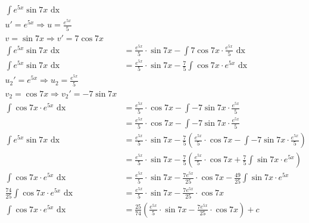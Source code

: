\documentclass[a4paper,12pt]{article}
\newcommand{\?}{\stackrel{?}{=}}
\begin{document}
\begin{definition}
\begin{my_example}
\begin{align*}
  \int e^{5x} \sin 7x \text{ dx}\\
  u' = e^{5x} \Rightarrow u = \frac{e^{5x}}{5}\\
  v = \sin 7x \Rightarrow v' = 7\cos 7x\\
  \int e^{5x} \sin 7x \text{ dx} &= \frac{e^{5x}}{5} \cdot \sin 7x - \int 7\cos 7x \cdot \frac{e^{5x}}{5} \text{ dx}\\
  \int e^{5x} \sin 7x \text{ dx} &= \frac{e^{5x}}{5} \cdot \sin 7x - \frac{7}{5} \int \cos 7x \cdot e^{5x} \text{ dx}\\
  u_2' = e^{5x} \Rightarrow u_2 = \frac{e^{5x}}{5}\\
  v_2 = \cos 7x \Rightarrow v_2' = -7\sin 7x\\
  \int \cos 7x \cdot e^{5x} \text{ dx} &= \frac{e^{5x}}{5} \cdot \cos 7x - \int -7\sin 7x \cdot \frac{e^{5x}}{5}\\
  &= \frac{e^{5x}}{5} \cdot \cos 7x - \int -7\sin 7x \cdot \frac{e^{5x}}{5}\\
  \int e^{5x} \sin 7x \text{ dx} &= \frac{e^{5x}}{5} \cdot \sin 7x - \frac{7}{5}\left(\frac{e^{5x}}{5} \cdot \cos 7x - \int -7\sin 7x \cdot \frac{e^{5x}}{5}\right)\\
  &= \frac{e^{5x}}{5} \cdot \sin 7x - \frac{7}{5}\left(\frac{e^{5x}}{5} \cdot \cos 7x + \frac75 \int \sin 7x \cdot e^{5x}\right)\\
  \int \cos 7x \cdot e^{5x} \text{ dx} &= \frac{e^{5x}}{5} \cdot \sin 7x - \frac{7e^{5x}}{25} \cdot \cos 7x - \frac{49}{25} \int \sin 7x \cdot e^{5x}\\
  \frac{74}{25} \int \cos 7x \cdot e^{5x} \text{ dx} &= \frac{e^{5x}}{5} \cdot \sin 7x - \frac{7e^{5x}}{25} \cdot \cos 7x\\
  \int \cos 7x \cdot e^{5x} \text{ dx} &= \frac{25}{74}\left(\frac{e^{5x}}{5} \cdot \sin 7x - \frac{7e^{5x}}{25} \cdot \cos 7x\right) + c\\
\end{align*}
\end{my_example}
\end{definition}
\end{document}
